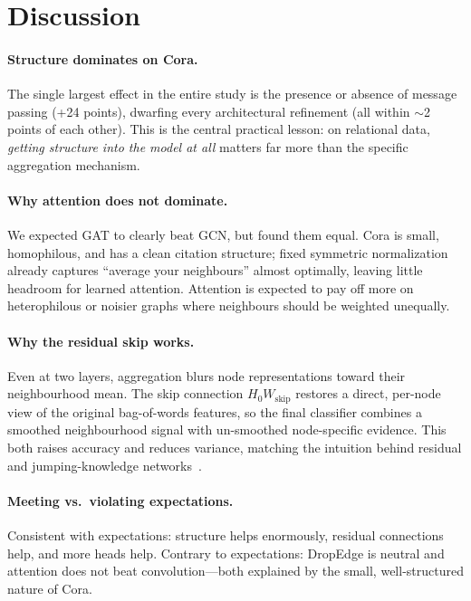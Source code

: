 \documentclass{article}
\begin{document}
\section{Discussion}
\label{sec:discussion}

\paragraph{Structure dominates on Cora.} The single largest effect in the entire
study is the presence or absence of message passing (+24 points), dwarfing every
architectural refinement (all within $\sim$2 points of each other). This is the
central practical lesson: on relational data, \emph{getting structure into the model
at all} matters far more than the specific aggregation mechanism.

\paragraph{Why attention does not dominate.} We expected GAT to clearly beat GCN, but
found them equal. Cora is small, homophilous, and has a clean citation structure;
fixed symmetric normalization already captures ``average your neighbours'' almost
optimally, leaving little headroom for learned attention. Attention is expected to pay
off more on heterophilous or noisier graphs where neighbours should be weighted
unequally.

\paragraph{Why the residual skip works.} Even at two layers, aggregation blurs node
representations toward their neighbourhood mean. The skip connection
$H_0 W_{\text{skip}}$ restores a direct, per-node view of the original bag-of-words
features, so the final classifier combines a smoothed neighbourhood signal with
un-smoothed node-specific evidence. This both raises accuracy and reduces variance,
matching the intuition behind residual and jumping-knowledge
networks~\cite{he2016resnet,xu2018jknet}.

\paragraph{Meeting vs.\ violating expectations.} Consistent with expectations:
structure helps enormously, residual connections help, and more heads help. Contrary
to expectations: DropEdge is neutral and attention does not beat convolution---both
explained by the small, well-structured nature of Cora.
\end{document}
